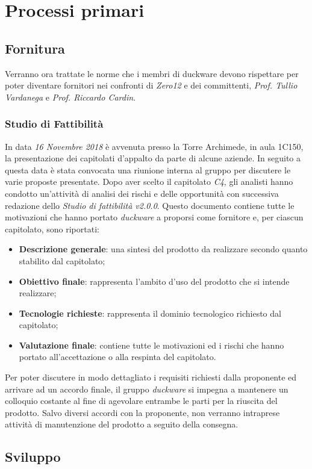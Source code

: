 \clearpage
\section{Processi primari}
\label{sec:proc_prim}
\subsection{Fornitura}
\label{sec:fornitura}
Verranno ora trattate le norme che i membri di duckware devono rispettare per poter diventare fornitori nei confronti di \emph{Zero12} e dei committenti, \emph{Prof. Tullio Vardanega} e \emph{Prof. Riccardo Cardin}.
\subsubsection{Studio di Fattibilità}
In data \emph{16 Novembre 2018} è avvenuta presso la Torre Archimede, in aula 1C150, la presentazione dei capitolati d’appalto da parte di alcune aziende. In seguito a questa data è stata convocata una riunione interna al gruppo per discutere le varie proposte presentate. Dopo aver scelto il capitolato \textit{C4}, gli analisti hanno condotto un'attività di analisi dei rischi e delle opportunità con successiva redazione dello \textit{Studio di fattibilità v2.0.0}. Questo documento contiene tutte le motivazioni che hanno portato \textit{duckware} a proporsi come fornitore e, per ciascun capitolato, sono riportati:
\begin{itemize}
    \item \textbf{Descrizione generale}: una sintesi del prodotto da realizzare secondo quanto stabilito dal capitolato;
    \item \textbf{Obiettivo finale}: rappresenta l'ambito d'uso del prodotto che si intende realizzare;
    \item \textbf{Tecnologie richieste}: rappresenta il dominio tecnologico richiesto dal capitolato;
    \item \textbf{Valutazione finale}: contiene tutte le motivazioni ed i rischi che hanno portato all'accettazione o alla respinta del capitolato.
\end{itemize}
Per poter discutere in modo dettagliato i requisiti richiesti dalla proponente ed arrivare ad un accordo finale, il gruppo \textit{duckware} si impegna a mantenere un colloquio costante al fine di agevolare entrambe le parti per la riuscita del prodotto. Salvo diversi accordi con la proponente, non verranno intraprese attività di manutenzione del prodotto a seguito della consegna.
\subsection{Sviluppo}
\label{sec:sviluppo}
